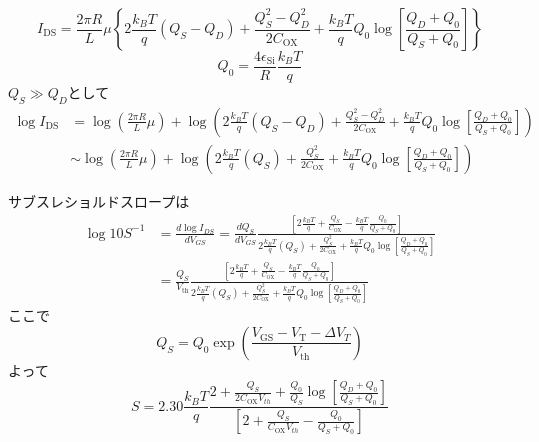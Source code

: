 \documentclass[11pt,uplatex]{jsarticle}
\def\d#1#2{\frac{d #1}{d #2}}
\begin{document}
\begin{equation}
 I_{\mathrm{DS}} = \frac{2 \pi R}{L}\mu
  \left\{
   2 \frac{k_B T}{q}(Q_S - Q_D) + \frac{Q_S^2-Q_D^2}{2C_{\mathrm{OX}}}
   + \frac{k_B T}{q}Q_0\log \left[\frac{Q_D + Q_0}{Q_S+Q_0}\right]
  \right\}
\end{equation}
\begin{equation}
 Q_0 = \frac{4 \epsilon_{\mathrm{Si}}}{R} \frac{k_B T}{q}
\end{equation}
$Q_S \gg Q_D$として
\begin{subequations}
 \begin{align}
 \log I_{\mathrm{DS}} 
 &= \log \left(\frac{2 \pi R}{L}\mu\right)
 +\log \left(
   2 \frac{k_B T}{q}(Q_S-Q_D) + \frac{Q_S^2-Q_D^2}{2C_{\mathrm{OX}}}
   + \frac{k_B T}{q}Q_0\log \left[\frac{Q_D+Q_0}{Q_S+Q_0}\right]
  \right) \\
 &\sim \log \left(\frac{2 \pi R}{L}\mu\right)
 +\log \left(
   2 \frac{k_B T}{q}(Q_S) + \frac{Q_S^2}{2C_{\mathrm{OX}}}
   + \frac{k_B T}{q} Q_0 \log \left[\frac{Q_D+Q_0}{Q_S+Q_0}\right]
	   \right)
 \end{align}
\end{subequations}

サブスレショルドスロープは
\begin{subequations}
 \begin{align}
 \log 10{S}^{-1}&=\d{\log{I_{DS}}}{V_{GS}}
  =  \d{Q_S}{V_{GS}} \frac{  \left[
   2 \frac{k_B T}{q}
   + \frac{Q_S}{C_{\mathrm{OX}}}
   - \frac{k_B T}{q} \frac{Q_0}{Q_S+Q_0} \right]
}{2 \frac{k_B T}{q}(Q_S) + \frac{Q_S^2}{2C_{\mathrm{OX}}}
+ \frac{k_B T}{q}Q_0\log \left[\frac{Q_D+Q_0}{Q_S+Q_0}\right]} \\
 &=\frac{Q_S}{V_{\mathrm{th}}}
  \frac{  \left[
   2 \frac{k_B T}{q}
   + \frac{Q_S}{C_{\mathrm{OX}}}
   - \frac{k_B T}{q} \frac{Q_0}{Q_S+Q_0} \right]
}{2 \frac{k_B T}{q}(Q_S) + \frac{Q_S^2}{2C_{\mathrm{OX}}}
  + \frac{k_B T}{q}Q_0\log \left[\frac{Q_D+Q_0}{Q_S+Q_0}\right]}
 \end{align}
\end{subequations}
ここで
\begin{equation}
 Q_S = Q_0 \exp\left(\frac{V_{\mathrm{GS}}-V_{\mathrm{T}}-\Delta V_{T}}{V_{\mathrm{th}}}\right)
\end{equation}
よって
\begin{equation}
 S = 2.30 \frac{k_B T}{q}
  \frac{2  + \frac{Q_S}{2C_{\mathrm{OX}}V_{th}}
  + \frac{Q_0}{Q_S}\log \left[\frac{Q_D+Q_0}{Q_S+Q_0}\right]}{\left[
   2 + \frac{Q_S}{C_{\mathrm{OX}}V_{th}}
   - \frac{Q_0}{Q_S+Q_0} \right]
  }
\end{equation}
\end{document}
